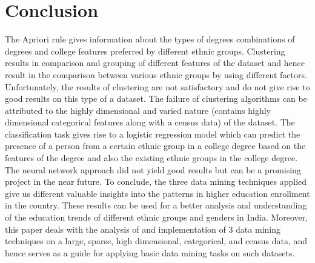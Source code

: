 \section{Conclusion}

The Apriori rule gives information about the types of degrees combinations of degrees and college features preferred by different ethnic groups. 
Clustering results in comparison and grouping of different features of the dataset and hence result in the comparison between various ethnic groups by using different factors. Unfortunately, the results of clustering are not satisfactory and do not give rise to good results on this type of a dataset. The failure of clustering algorithms can be attributed to the highly dimensional and varied nature (contains highly dimensional categorical features along with a census data) of the dataset. 
The classification task gives rise to a logistic regression model which can predict the presence of a person from a certain ethnic group in a college degree based on the features of the degree and also the existing ethnic groups in the college degree. The neural network approach did not yield good results but can be a promising project in the near future.
To conclude, the three data mining techniques applied give us different valuable insights into the patterns in higher education enrollment in the country. These results can be used for a better analysis and understanding of the education trends of different ethnic groups and genders in India. Moreover, this paper deals with the analysis of and implementation of 3 data mining techniques on a large, sparse, high dimensional, categorical, and census data, and hence serves as a guide for applying basic data mining tasks on such datasets.